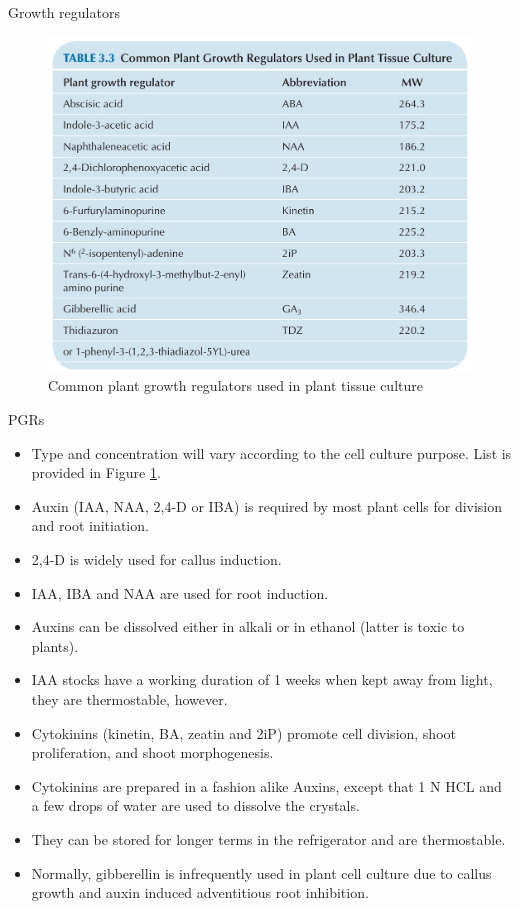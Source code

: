 \documentclass[
  ignorenonframetext,
  aspectratio=169]{beamer}
\providecommand{\tightlist}{%
  \setlength{\itemsep}{0pt}\setlength{\parskip}{0pt}}
\begin{document}
\begin{frame}{Growth regulators}
\protect\hypertarget{growth-regulators}{}
\begin{figure}
\includegraphics[width=0.4\linewidth]{../images/pgr_tissue_culture} \caption{Common plant growth regulators used in plant tissue culture}\label{fig:pgr}
\end{figure}
\end{frame}

\begin{frame}{PGRs}
\protect\hypertarget{pgrs}{}
\begin{itemize}
\tightlist
\item
  Type and concentration will vary according to the cell culture
  purpose. List is provided in Figure \ref{fig:pgr}.
\item
  Auxin (IAA, NAA, 2,4-D or IBA) is required by most plant cells for
  division and root initiation.
\item
  2,4-D is widely used for callus induction.
\item
  IAA, IBA and NAA are used for root induction.
\item
  Auxins can be dissolved either in alkali or in ethanol (latter is
  toxic to plants).
\item
  IAA stocks have a working duration of 1 weeks when kept away from
  light, they are thermostable, however.
\end{itemize}
\end{frame}

\begin{frame}{}
\protect\hypertarget{section-5}{}
\begin{itemize}
\tightlist
\item
  Cytokinins (kinetin, BA, zeatin and 2iP) promote cell division, shoot
  proliferation, and shoot morphogenesis.
\item
  Cytokinins are prepared in a fashion alike Auxins, except that 1 N HCL
  and a few drops of water are used to dissolve the crystals.
\item
  They can be stored for longer terms in the refrigerator and are
  thermostable.
\item
  Normally, gibberellin is infrequently used in plant cell culture due
  to callus growth and auxin induced adventitious root inhibition.
\end{itemize}
\end{frame}
\end{document}
